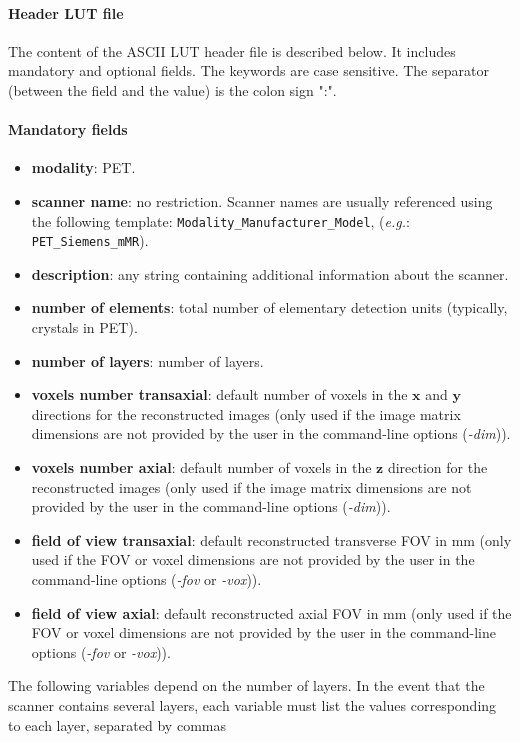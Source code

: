 \documentclass[a4paper, 11pt]{article}
\begin{document}
\paragraph{Header LUT file}
The content of the ASCII LUT header file is described below. It includes mandatory and optional fields. The keywords are case sensitive.
The separator (between the field and the value) is the colon sign ":".
\paragraph{Mandatory fields}
\begin{itemize}
  \item \textbf{modality}: PET.
  \item \textbf{scanner name}: no restriction. Scanner names are usually referenced using the following template: 
       \texttt{Modality\_Manufacturer\_Model}, ({\it e.g.}: \texttt{PET\_Siemens\_mMR}).
  \item \textbf{description}: any string containing additional information about the scanner.
  \item \textbf{number of elements}: total number of elementary detection units (typically, crystals in PET).
  \item \textbf{number of layers}: number of layers.
  \item \textbf{voxels number transaxial}: default number of voxels in the ${\mathbf x}$ and ${\mathbf y}$ directions for the reconstructed
        images (only used if the image matrix dimensions are not provided by the user in the command-line options (\textit{-dim})).
  \item \textbf{voxels number axial}: default number of voxels in the ${\mathbf z}$ direction for the reconstructed images (only used  if the
        image matrix dimensions are not provided by the user in the command-line options (\textit{-dim})).
  \item \textbf{field of view transaxial}: default reconstructed transverse FOV in mm (only used if the FOV or voxel dimensions are not provided
        by the user in the command-line options (\textit{-fov} or \textit{-vox})).
  \item \textbf{field of view axial}: default reconstructed axial FOV in mm (only used  if the FOV or voxel dimensions are not provided by the
        user in the command-line options (\textit{-fov} or \textit{-vox})).
\end{itemize}
The following variables depend on the number of layers. 
In the event that the scanner contains several layers, each variable must list the values corresponding to each layer, separated by commas
\end{document}
